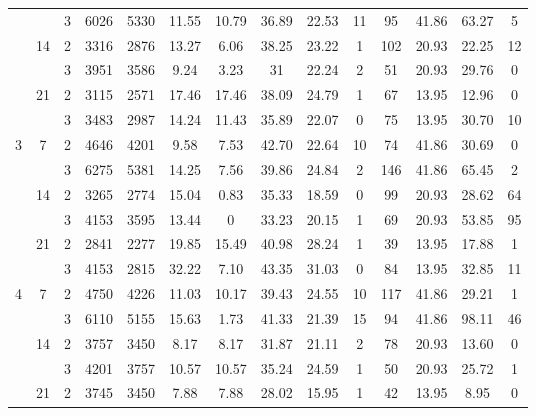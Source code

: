 \begin{tabular}{|ccc|ccc|ccc|ccc|c|c|}
  &    & 3 &  6026 &   5330 & 11.55 &   10.79 &   36.89 &   22.53 &   11 &   95 &   41.86 & 63.27 &     5 \\
\cline{2-14}
  & \multirow{2}{*}{14} & 2 &  3316 &   2876 & 13.27 &    6.06 &   38.25 &   23.22 &    1 &  102 &   20.93 & 22.25 &    12 \\
  &    & 3 &  3951 &   3586 &  9.24 &    3.23 &   31 &   22.24 &    2 &   51 &   20.93 & 29.76 &     0 \\
\cline{2-14}
  & \multirow{2}{*}{21} & 2 &  3115 &   2571 & 17.46 &   17.46 &   38.09 &   24.79 &    1 &   67 &   13.95 & 12.96 &     0 \\
  &    & 3 &  3483 &   2987 & 14.24 &   11.43 &   35.89 &   22.07 &    0 &   75 &   13.95 & 30.70 &    10 \\
\cline{1-14}
\cline{2-14}
\multirow{6}{*}{3} & \multirow{2}{*}{7} & 2 &  4646 &   4201 &  9.58 &    7.53 &   42.70 &   22.64 &   10 &   74 &   41.86 & 30.69 &     0 \\
  &    & 3 &  6275 &   5381 & 14.25 &    7.56 &   39.86 &   24.84 &    2 &  146 &   41.86 & 65.45 &     2 \\
\cline{2-14}
  & \multirow{2}{*}{14} & 2 &  3265 &   2774 & 15.04 &    0.83 &   35.33 &   18.59 &    0 &   99 &   20.93 & 28.62 &    64 \\
  &    & 3 &  4153 &   3595 & 13.44 &    0 &   33.23 &   20.15 &    1 &   69 &   20.93 & 53.85 &    95 \\
\cline{2-14}
  & \multirow{2}{*}{21} & 2 &  2841 &   2277 & 19.85 &   15.49 &   40.98 &   28.24 &    1 &   39 &   13.95 & 17.88 &     1 \\
  &    & 3 &  4153 &   2815 & 32.22 &    7.10 &   43.35 &   31.03 &    0 &   84 &   13.95 & 32.85 &    11 \\
\cline{1-14}
\cline{2-14}
\multirow{6}{*}{4} & \multirow{2}{*}{7} & 2 &  4750 &   4226 & 11.03 &   10.17 &   39.43 &   24.55 &   10 &  117 &   41.86 & 29.21 &     1 \\
  &    & 3 &  6110 &   5155 & 15.63 &    1.73 &   41.33 &   21.39 &   15 &   94 &   41.86 & 98.11 &    46 \\
\cline{2-14}
  & \multirow{2}{*}{14} & 2 &  3757 &   3450 &  8.17 &    8.17 &   31.87 &   21.11 &    2 &   78 &   20.93 & 13.60 &     0 \\
  &    & 3 &  4201 &   3757 & 10.57 &   10.57 &   35.24 &   24.59 &    1 &   50 &   20.93 & 25.72 &     1 \\
\cline{2-14}
  & \multirow{2}{*}{21} & 2 &  3745 &   3450 &  7.88 &    7.88 &   28.02 &   15.95 &    1 &   42 &   13.95 &  8.95 &     0 \\

\end{tabular}
